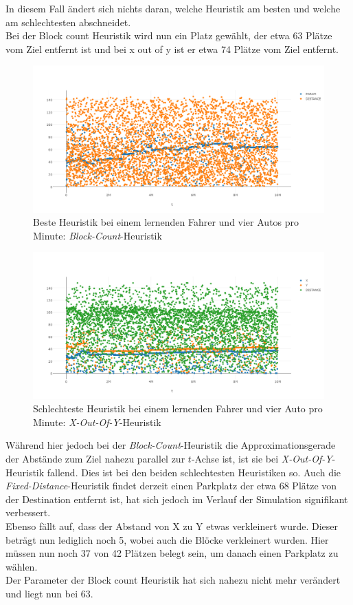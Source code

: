 In diesem Fall ändert sich nichts daran, welche Heuristik am besten und welche am schlechtesten abschneidet.\\
Bei der Block count Heuristik wird nun ein Platz gewählt, der etwa 63 Plätze vom Ziel entfernt ist und bei x out of y ist er etwa 74 Plätze vom Ziel entfernt. \\
\begin{figure}
	\includegraphics[width=\textwidth]{analyse/SingleMutant/blockcount4.png}
	\caption{Beste Heuristik bei einem lernenden Fahrer und vier Autos pro Minute: \emph{Block-Count}-Heuristik}\label{fig:res_sm_4pm_best}
\end{figure}
\begin{figure}
	\includegraphics[width=\textwidth]{analyse/SingleMutant/xy4.png}
	\caption{Schlechteste Heuristik bei einem lernenden Fahrer und vier Auto pro Minute: \emph{X-Out-Of-Y}-Heuristik}\label{fig:res_sm_4pm_worst}
\end{figure}
Während hier jedoch bei der \emph{Block-Count}-Heuristik die Approximationsgerade der Abstände zum Ziel nahezu parallel zur $t$-Achse ist, ist sie bei \emph{X-Out-Of-Y}-Heuristik fallend. Dies ist bei den beiden schlechtesten Heuristiken so. Auch die \emph{Fixed-Distance}-Heuristik findet derzeit einen Parkplatz der etwa 68 Plätze von der Destination entfernt ist, hat sich jedoch im Verlauf der Simulation signifikant verbessert.\\
Ebenso fällt auf, dass der Abstand von X zu Y etwas verkleinert wurde. Dieser beträgt nun lediglich noch 5, wobei auch die Blöcke verkleinert wurden. Hier müssen nun noch 37 von 42 Plätzen belegt sein, um danach einen Parkplatz zu wählen.\\
Der Parameter der Block count Heuristik hat sich nahezu nicht mehr verändert und liegt nun bei 63.\\

